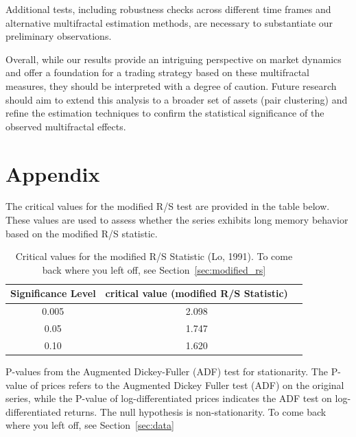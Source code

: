 \documentclass[11pt]{extarticle}
\begin{document}
Additional tests, including robustness checks across different time frames and alternative multifractal estimation
methods, are necessary to substantiate our preliminary observations.

Overall, while our results provide an intriguing perspective on market dynamics and offer a foundation for a trading
strategy based on these multifractal measures, they should be interpreted with a degree of caution. Future research
should aim to extend this analysis to a broader set of assets (pair clustering) and refine the estimation techniques
to confirm the statistical significance of the observed multifractal effects.

\section{Appendix}

The critical values for the modified R/S test are provided in the table below. These values are used to assess whether the series exhibits long memory behavior based on the modified R/S statistic.

\begin{table}[ht!]
\centering
\begin{tabular}{|c|c|c|}
\hline
\textbf{Significance Level} & \textbf{critical value (modified R/S Statistic)} \\
\hline
0.005 & 2.098\\
0.05 & 1.747\\
0.10 & 1.620\\

\hline
\end{tabular}
\caption{Critical values for the modified R/S Statistic (Lo, 1991). To come back where you left off, see Section~\ref{sec:modified_rs}}
    \label{table:critical_values}
\end{table}

\begin{table}[h!]
    \centering
    \caption{P-values from the Augmented Dickey-Fuller (ADF) test for stationarity. The P-value of prices refers to the Augmented Dickey Fuller test (ADF) on the original series,
     while the P-value of log-differentiated prices indicates the ADF test on log-differentiated returns. The null hypothesis is non-stationarity.
    To come back where you left off, see Section~\ref{sec:data}}
    \label{table:adf_results}
\end{table}
\end{document}
